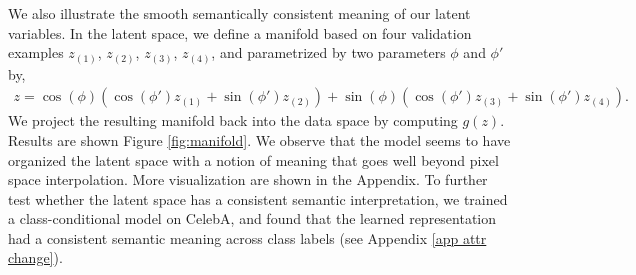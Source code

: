 \documentclass{article}
\begin{document}
We also illustrate the smooth semantically consistent meaning of our latent variables.
In the latent space, we define a manifold based on four validation examples $z_{(1)}$, $z_{(2)}$, $z_{(3)}$, $z_{(4)}$, and parametrized by two parameters $\phi$ and $\phi'$ by,
\begin{align}
z = \cos(\phi) \left(\cos(\phi') z_{(1)} + \sin(\phi') z_{(2)}\right) + \sin(\phi) \left(\cos(\phi') z_{(3)} + \sin(\phi') z_{(4)}\right)
.
\label{eq:manifold}
\end{align}
We project the resulting manifold back into the data space by computing $g(z)$. Results are shown Figure \ref{fig:manifold}. We observe that the model seems to have organized the latent space with a notion of meaning that goes well beyond pixel space interpolation. More visualization are shown in the Appendix. To further test whether the latent space has a consistent semantic interpretation, we trained a class-conditional model on CelebA, and found that the learned representation had a consistent semantic meaning across class labels (see Appendix \ref{app attr change}).




\end{document}
